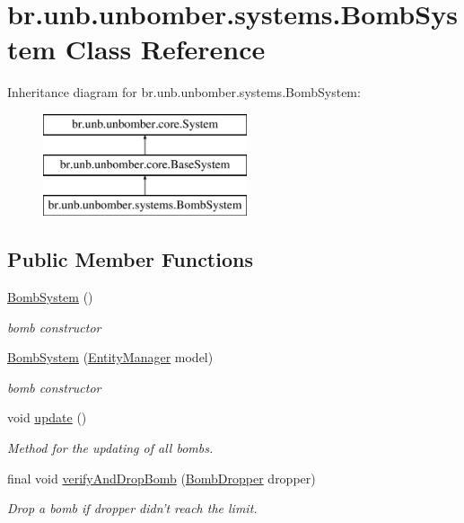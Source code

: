 \hypertarget{classbr_1_1unb_1_1unbomber_1_1systems_1_1_bomb_system}{\section{br.\+unb.\+unbomber.\+systems.\+Bomb\+System Class Reference}
\label{classbr_1_1unb_1_1unbomber_1_1systems_1_1_bomb_system}
}
Inheritance diagram for br.\+unb.\+unbomber.\+systems.\+Bomb\+System\+:\begin{figure}[H]
\begin{center}
\leavevmode
\includegraphics[height=3.000000cm]{classbr_1_1unb_1_1unbomber_1_1systems_1_1_bomb_system}
\end{center}
\end{figure}
\subsection*{Public Member Functions}
\begin{DoxyCompactItemize}
\item 
\hyperlink{classbr_1_1unb_1_1unbomber_1_1systems_1_1_bomb_system_a504e7f8b28fa329cc3c675728f385a40}{Bomb\+System} ()
\begin{DoxyCompactList}\small\item\em bomb constructor \end{DoxyCompactList}\item 
\hyperlink{classbr_1_1unb_1_1unbomber_1_1systems_1_1_bomb_system_aed218132c2c620ecf2ff739277712c83}{Bomb\+System} (\hyperlink{interfacebr_1_1unb_1_1unbomber_1_1core_1_1_entity_manager}{Entity\+Manager} model)
\begin{DoxyCompactList}\small\item\em bomb constructor \end{DoxyCompactList}\item 
void \hyperlink{classbr_1_1unb_1_1unbomber_1_1systems_1_1_bomb_system_a4ba7ac7c485767d8558c0d66d3eaef8d}{update} ()
\begin{DoxyCompactList}\small\item\em Method for the updating of all bombs. \end{DoxyCompactList}\item 
final void \hyperlink{classbr_1_1unb_1_1unbomber_1_1systems_1_1_bomb_system_a16b823fc7dcf24521549a0c3ed4f61d1}{verify\+And\+Drop\+Bomb} (\hyperlink{classbr_1_1unb_1_1unbomber_1_1component_1_1_bomb_dropper}{Bomb\+Dropper} dropper)
\begin{DoxyCompactList}\small\item\em Drop a bomb if dropper didn't reach the limit. \end{DoxyCompactList}\end{DoxyCompactItemize}
